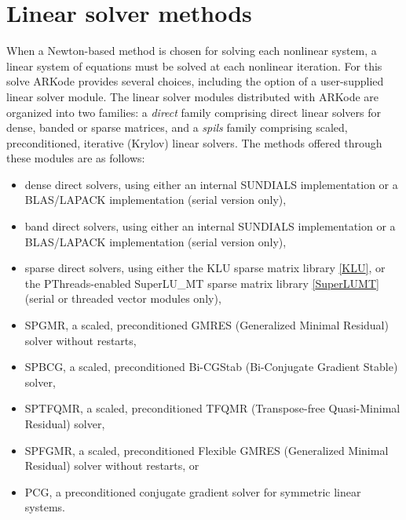 \documentclass[letterpaper,10pt,english]{sphinxmanual}
\begin{document}
\section{Linear solver methods}
\label{Mathematics:linear-solver-methods}\label{Mathematics:mathematics-linear}
When a Newton-based method is chosen for solving each nonlinear
system, a linear system of equations must be solved at each nonlinear
iteration.  For this solve ARKode provides several choices, including
the option of a user-supplied linear solver module.  The linear solver
modules distributed with ARKode are organized into two families: a
\emph{direct} family comprising direct linear solvers for dense, banded or
sparse matrices, and a \emph{spils} family comprising scaled, preconditioned,
iterative (Krylov) linear solvers.  The methods offered through these
modules are as follows:
\begin{itemize}
\item {} 
dense direct solvers, using either an internal SUNDIALS
implementation or a BLAS/LAPACK implementation (serial version
only),

\item {} 
band direct solvers, using either an internal SUNDIALS
implementation or a BLAS/LAPACK implementation (serial version
only),

\item {} 
sparse direct solvers, using either the KLU sparse matrix library
{\hyperref[References:klu]{{[}KLU{]}}}, or the PThreads-enabled SuperLU\_MT sparse matrix library
{\hyperref[References:superlumt]{{[}SuperLUMT{]}}} (serial or threaded vector modules only),

\item {} 
SPGMR, a scaled, preconditioned GMRES (Generalized Minimal Residual)
solver without restarts,

\item {} 
SPBCG, a scaled, preconditioned Bi-CGStab (Bi-Conjugate Gradient
Stable) solver,

\item {} 
SPTFQMR, a scaled, preconditioned TFQMR (Transpose-free
Quasi-Minimal Residual) solver,

\item {} 
SPFGMR, a scaled, preconditioned Flexible GMRES (Generalized Minimal
Residual) solver without restarts, or

\item {} 
PCG, a preconditioned conjugate gradient solver for symmetric linear
systems.

\end{itemize}
\end{document}
